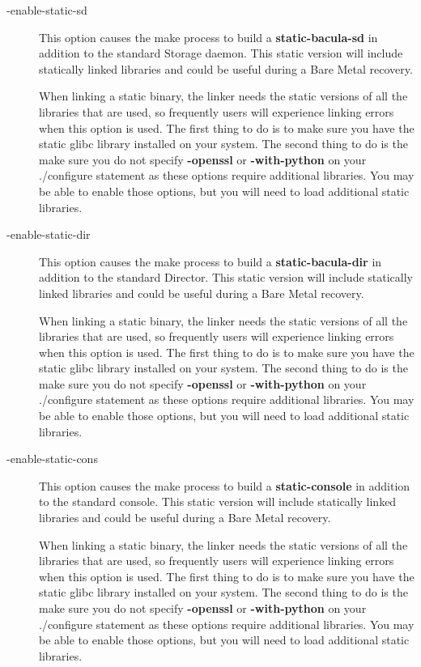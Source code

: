 \begin{description}
\item [ {-}{\-}enable-static-sd]
   This option causes the make process to build a {\bf static-bacula-sd} in
   addition to the standard Storage daemon.  This static version will
   include statically linked libraries and could be useful during a Bare
   Metal recovery.

   When linking a static binary, the linker needs the static versions
   of all the libraries that are used, so frequently users will 
   experience linking errors when this option is used. The first 
   thing to do is to make sure you have the static glibc library 
   installed on your system. The second thing to do is the make sure
   you do not specify {\bf {-}{\-}openssl} or {\bf {-}{\-}with-python}
   on your ./configure statement as these options require additional
   libraries. You may be able to enable those options, but you will
   need to load additional static libraries.


\item [ {-}{\-}enable-static-dir]
   This option causes the make process to build a {\bf static-bacula-dir}
   in addition to the standard Director.  This static version will include
   statically linked libraries and could be useful during a Bare Metal
   recovery.

   When linking a static binary, the linker needs the static versions
   of all the libraries that are used, so frequently users will 
   experience linking errors when this option is used. The first 
   thing to do is to make sure you have the static glibc library 
   installed on your system. The second thing to do is the make sure
   you do not specify {\bf {-}{\-}openssl} or {\bf {-}{\-}with-python}
   on your ./configure statement as these options require additional
   libraries. You may be able to enable those options, but you will
   need to load additional static libraries.


\item [ {-}{\-}enable-static-cons]
   This option causes the make process to build a {\bf static-console} in
   addition to the standard console.  This static version will include
   statically linked libraries and could be useful during a Bare Metal
   recovery.

   When linking a static binary, the linker needs the static versions
   of all the libraries that are used, so frequently users will 
   experience linking errors when this option is used. The first 
   thing to do is to make sure you have the static glibc library 
   installed on your system. The second thing to do is the make sure
   you do not specify {\bf {-}{\-}openssl} or {\bf {-}{\-}with-python}
   on your ./configure statement as these options require additional
   libraries. You may be able to enable those options, but you will
   need to load additional static libraries.



\end{description}
